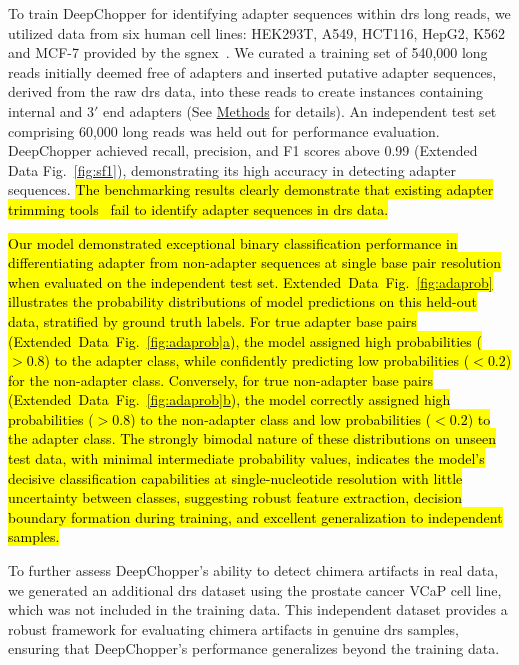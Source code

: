 \documentclass[pdflatex,sn-nature, lineno]{sn-jnl}%
\newcommand{\edfigref}[2]{Extended Data Fig.~\hyperref[#1]{\ref*{#1}#2}}
\begin{document}
To train DeepChopper for identifying adapter sequences within \gls{drs} long reads, we utilized data from six human cell lines: HEK293T, A549, HCT116, HepG2, K562 and MCF-7 provided by the \gls{sgnex}~\cite{chen2021systematic}.
We curated a training set of 540,000 long reads initially deemed free of adapters and inserted putative adapter sequences, derived from the raw \gls{drs} data, into these reads to create instances containing internal and $3'$ end adapters (See \hyperref[sec:methods]{Methods} for details).
An independent test set comprising 60,000 long reads was held out for performance evaluation.
DeepChopper achieved recall, precision, and F1 scores above 0.99 (\edfigref{fig:sf1}{}), demonstrating its high accuracy in detecting adapter sequences.
\hl{The benchmarking results clearly demonstrate that existing adapter trimming tools\mbox{~\cite{pychopper, Wick2017, bonenfant2023porechop}} fail to identify adapter sequences in \mbox{\gls{drs}} data.}


\hl{Our model demonstrated exceptional binary classification performance in differentiating adapter from non-adapter sequences at single base pair resolution when evaluated on the independent test set.
\mbox{\edfigref{fig:adaprob}{}}  illustrates the probability distributions of model predictions on this held-out data, stratified by ground truth labels.
For true adapter base pairs (\mbox{\edfigref{fig:adaprob}{a}}), the model assigned high probabilities ($>0.8$) to the adapter class, while confidently predicting low probabilities ($<0.2$) for the non-adapter class.
Conversely, for true non-adapter base pairs (\mbox{\edfigref{fig:adaprob}{b}}), the model correctly assigned high probabilities ($>0.8$) to the non-adapter class and low probabilities ($<0.2$) to the adapter class.
The strongly bimodal nature of these distributions on unseen test data, with minimal intermediate probability values, indicates the model's decisive classification capabilities at single-nucleotide resolution with little uncertainty between classes, suggesting robust feature extraction, decision boundary formation during training, and excellent generalization to independent samples.}

To further assess DeepChopper’s ability to detect chimera artifacts in real data, we generated an additional \gls{drs} dataset using the prostate cancer VCaP cell line, which was not included in the training data.
This independent dataset provides a robust framework for evaluating chimera artifacts in genuine \gls{drs} samples, ensuring that DeepChopper's performance generalizes beyond the training data.
\end{document}
